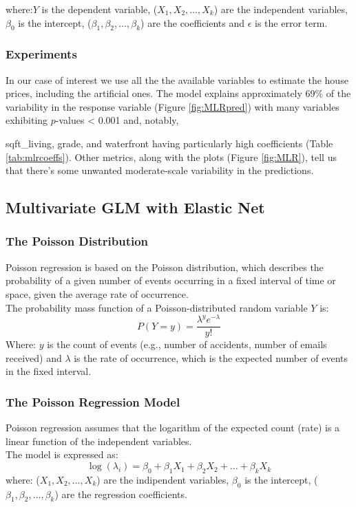 \documentclass[a4paper, 11pt]{article}
\begin{document}
\begin{multicols}{2}
where:$Y$ is the dependent variable, ($X_1, X_2,\dots,X_k$) are the independent variables, $\beta_0$ is the intercept, ($\beta_1,\beta_2, \dots, \beta_k$) are the coefficients and $\epsilon$ is the error term.\\

\subsubsection*{Experiments}
In our case of interest we use all the the available variables to estimate the house prices, including the artificial ones. The model explains approximately 69\% of the variability in the response variable (Figure \ref{fig:MLRpred}) with many variables exhibiting \( p \)-values < 0.001 and, notably, {sqft\_living, grade, and waterfront having particularly high coefficients (Table \ref{tab:mlrcoeffs}). Other metrics, along with the plots (Figure \ref{fig:MLR}), tell us that there's some unwanted moderate-scale variability in the predictions.


\subsection{Multivariate GLM with Elastic Net} \vspace{-3pt}
\subsubsection*{The Poisson Distribution}
Poisson regression is based on the Poisson distribution, which describes the probability of a given number of events occurring in a fixed interval of time or space, given the average rate of occurrence.\\
The probability mass function of a Poisson-distributed random variable $Y$ is:
\begin{equation}
P(Y=y)= \frac{\lambda^ye^{-\lambda}}{y!}
\end{equation}
Where: $y$ is the count of events (e.g., number of accidents, number of emails received) and $\lambda$ is the rate of occurrence, which is the expected number of events in the fixed interval.
\subsubsection*{The Poisson Regression Model}
Poisson regression assumes that the logarithm of the expected count (rate) is a linear function of the independent variables.\\
The model is expressed as:
\begin{equation}
\log(\lambda_i)=\beta_0+\beta_1X_1+\beta_2X_2+\dots+\beta_kX_k
\end{equation}
where: ($X_1, X_2,\dots,X_k$) are the indipendent variables, $\beta_0$ is the intercept, ($\beta_1,\beta_2, \dots, \beta_k$) are the regression coefficients.

}
\end{multicols}
\end{document}
